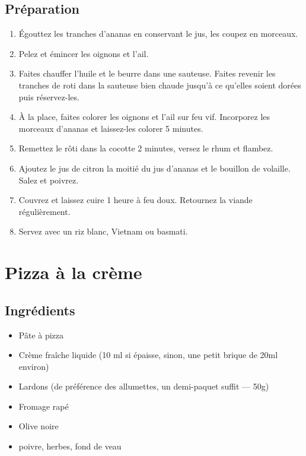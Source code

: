 \subsection*{Préparation}
\begin{enumerate}
\item Égouttez les tranches d’ananas en conservant le jus, les coupez en morceaux.
\item Pelez et émincer les oignons et l’ail.
\item Faites chauffer l’huile et le beurre dans une sauteuse. Faites revenir les tranches de roti dans la sauteuse bien chaude jusqu'à ce qu'elles soient dorées puis réservez-les.
\item À la place, faites colorer les oignons et l’ail sur feu vif. Incorporez les morceaux d’ananas et laissez-les colorer 5 minutes.
\item Remettez le rôti dans la cocotte 2 minutes, versez le rhum et flambez.
\item Ajoutez le jus de citron la moitié du jus d'ananas et le bouillon de volaille. Salez et poivrez.
\item Couvrez et laissez cuire 1 heure à feu doux. Retournez la viande régulièrement.
\item Servez avec un riz blanc, Vietnam ou basmati.
\end{enumerate}

\newpage
\section{Pizza à la crème}
\subsection*{Ingrédients}
\begin{itemize}
\item Pâte à pizza
\item Crème fraîche liquide (10 ml si épaisse, sinon, une petit brique de 20ml environ)
\item Lardons (de préférence des allumettes, un demi-paquet suffit --- 50g)
\item Fromage rapé
\item Olive noire
\item poivre, herbes, fond de veau
\end{itemize}

